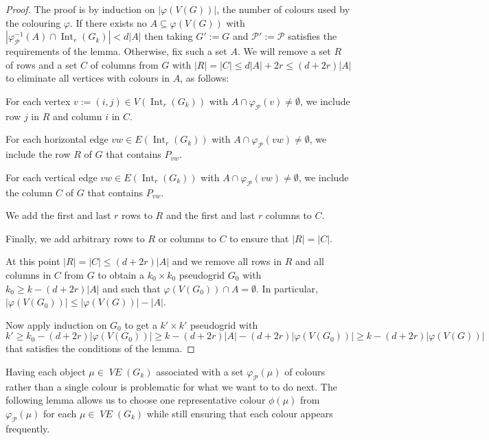 \documentclass{patmorin}
\DeclareMathOperator{\interior}{Int}
\DeclareMathOperator{\VE}{\mathit{VE}}
\begin{document}
\begin{proof}
  The proof is by induction on $|\varphi(V(G))|$, the number of colours used by the colouring $\varphi$.  If there exists no $A\subseteq \varphi(V(G))$ with $|\varphi_{\mathcal{P}}^{-1}(A)\cap\interior_r(G_k)| < d|A|$ then taking $G':=G$ and $\mathcal{P}':=\mathcal{P}$ satisfies the requirements of the lemma.  Otherwise, fix such a set $A$. We will remove a set $R$ of rows and a set $C$ of columns from $G$ with $|R|=|C|\le d|A|+2r \le (d+2r)|A|$ to eliminate all vertices with colours in $A$, as follows:
  \begin{compactitem}
    \item For each vertex $v:=(i,j)\in V(\interior_r(G_{k}))$ with $A\cap\varphi_\mathcal{P}(v)\neq\emptyset$, we include row $j$ in $R$ and column $i$ in $C$.
    \item For each horizontal edge $vw\in E(\interior_r(G_{k}))$ with $A\cap\varphi_\mathcal{P}(vw)\neq\emptyset$, we include the row $R$ of $G$ that contains $P_{vw}$.
    \item For each vertical edge $vw\in E(\interior_r(G_{k}))$ with $A\cap\varphi_\mathcal{P}(vw)\neq\emptyset$, we include the column $C$ of $G$ that contains $P_{vw}$.
    \item We add the first and last $r$ rows to $R$ and the first and last $r$ columns to $C$.
    \item Finally, we add arbitrary rows to $R$ or columns to $C$ to ensure that $|R|=|C|$.
  \end{compactitem}
  At this point $|R|=|C|\le (d+2r)|A|$ and we remove all rows in $R$ and all columns in $C$ from $G$ to obtain a $k_0\times k_0$ pseudogrid $G_0$ with $k_0\ge k-(d+2r)|A|$ and such that $\varphi(V(G_0))\cap A=\emptyset$.  In particular, $|\varphi(V(G_0))|\le |\varphi(V(G))|-|A|$.

  Now apply induction on $G_0$ to get a $k'\times k'$ pseudogrid with
  \[
    k'\ge k_0-(d+2r)|\varphi(V(G_0))|
      \ge k-(d+2r)|A|-(d+2r)|\varphi(V(G_0))|
      \ge k - (d+2r)|\varphi(V(G))|
  \]
  that satisfies the conditions of the lemma.
\end{proof}


Having each object $\mu\in\VE(G_k)$ associated with a set $\varphi_\mathcal{P}(\mu)$ of colours rather than a single colour is problematic for what we want to to do next.  The following lemma allows us to choose one representative colour $\phi(\mu)$ from $\varphi_{\mathcal{P}}(\mu)$ for each $\mu\in \VE(G_k)$ while still ensuring that each colour appears frequently.
\end{document}
